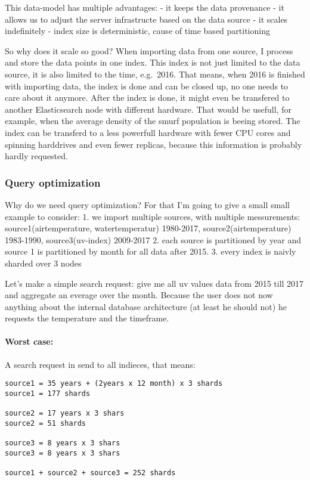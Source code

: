 This data-model has multiple advantages: - it keeps the data provenance
- it allows us to adjust the server infrastructe based on the data
source - it scales indefinitely - index size is deterministic, cause of
time based partitioning

So why does it scale so good? When importing data from one source, I
process and store the data points in one index. This index is not just
limited to the data source, it is also limited to the time, e.g.~2016.
That means, when 2016 is finished with importing data, the index is done
and can be closed up, no one needs to care about it anymore. After the
index is done, it might even be transfered to another Elasticsearch node
with different hardware. That would be usefull, for example, when the
average density of the smurf population is beeing stored. The index can
be transferd to a less powerfull hardware with fewer CPU cores and
spinning harddrives and even fewer replicas, because this information is
probably hardly requested.

\subsubsection{Query optimization}\label{query-optimization}

Why do we need query optimization? For that I'm going to give a small
small example to consider: 1. we import multiple sources, with multiple
messurements: source1(airtemperature, watertemperatur) 1980-2017,
source2(airtemperature) 1983-1990, source3(uv-index) 2009-2017 2. each
source is partitioned by year and source 1 is partitioned by month for
all data after 2015. 3. every index is naivly sharded over 3 nodes

Let's make a simple search request: give me all uv values data from 2015
till 2017 and aggregate an everage over the month. Because the user does
not now anything about the internal database architecture (at least he
should not) he requests the temperature and the timeframe.

\paragraph{Worst case:}\label{worst-case}

A search request in send to all indieces, that means:

\begin{verbatim}
source1 = 35 years + (2years x 12 month) x 3 shards
source1 = 177 shards

source2 = 17 years x 3 shars
source2 = 51 shards

source3 = 8 years x 3 shars
source3 = 8 years x 3 shars

source1 + source2 + source3 = 252 shards
\end{verbatim}

